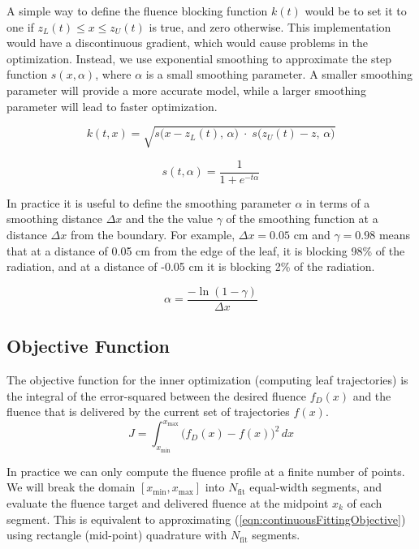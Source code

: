 A simple way to define the fluence blocking function $k(t)$
would be to set it to one if $z_L(t) \leq x \leq z_U(t)$
is true, and zero otherwise.
This implementation would have a discontinuous gradient, which would cause problems in the optimization.
Instead, we use exponential smoothing to approximate the step function $s(x,\alpha)$,
where $\alpha$ is a small smoothing parameter.
A smaller smoothing parameter will provide a more accurate model,
while a larger smoothing parameter will lead to faster optimization.

\begin{equation}
  k(t, x) = \sqrt{s\big(x - z_L(t), \, \alpha\big) \; \cdot \; s\big(z_U(t) - z, \, \alpha\big)}
\end{equation}

\begin{equation}
  s(t, \alpha) = \frac{1}{1 + e^{-t \alpha}}
\end{equation}

In practice it is useful to define the smoothing parameter $\alpha$ in terms of
a smoothing distance $\Delta x$ and the the
value $\gamma$ of the smoothing function at a distance $\Delta x$ from the boundary.
For example, $\Delta x = 0.05$ cm and $\gamma = 0.98$ means that
at a distance of 0.05 cm from the edge of the leaf, it is blocking 98\% of the radiation,
and at a distance of -0.05 cm it is blocking 2\% of the radiation.

\begin{equation}
  \alpha = \frac{-\ln(1-\gamma)}{\Delta x}
  \label{eqn:SmoothingDistanceParameter}
\end{equation}

\subsection{Objective Function}

The objective function for the inner optimization (computing leaf trajectories)
is the integral of the error-squared between the desired fluence $f_D(x)$ and the fluence that
is delivered by the current set of trajectories $f(x)$.
\begin{equation}
  J = \int_{x_\text{min}}^{x_\text{max}} \! \bigg( f_D(x) - f(x) \bigg)^2 \,dx
  \label{eqn:continuousFittingObjective}
\end{equation}

In practice we can only compute the fluence profile at a finite number of points.
We will break the domain $[x_\text{min}, x_\text{max}]$ into $N_\text{fit}$ equal-width segments,
and evaluate the fluence target and delivered fluence at the midpoint $x_k$ of each segment.
This is equivalent to approximating (\ref{eqn:continuousFittingObjective}) using rectangle (mid-point)
quadrature with $N_\text{fit}$ segments.

